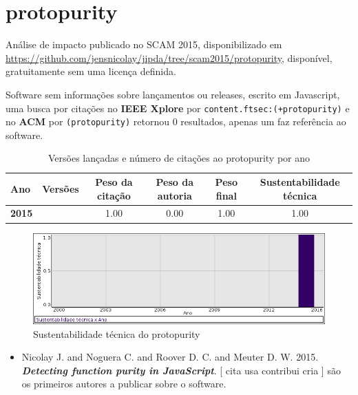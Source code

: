 \section{protopurity}

Análise de impacto
publicado no SCAM 2015,
disponibilizado em \url{https://github.com/jensnicolay/jipda/tree/scam2015/protopurity},
disponível,
gratuitamente
sem uma licença definida.

Software sem informações sobre lançamentos ou releases,
escrito em Javascript,
uma busca por citações no {\bf IEEE Xplore} por
\texttt{content.ftsec:(+protopurity)}
e no {\bf ACM} por
\texttt{(protopurity)}
retornou
0 resultados,
apenas um faz referência ao software.


\begin{table}[H]
\caption{Versões lançadas e número de citações ao protopurity por ano}
\centering
\begin{tabular}{| l | c | c | c | c | c |}
  \hline
  Ano & Versões & Peso da citação & Peso da autoria & Peso final & Sustentabilidade técnica \\
  \hline
            {\bf 2015}
          &
          
          &
          1.00
          &
          0.00
          &
          1.00
          &
            {\color{blue} 1.00}
          \\
\hline
\end{tabular}
\end{table}

\begin{figure}[h]
  \center
  \includegraphics[scale=0.50]{imagens/softwares-charts/protopurity.png}
  \caption{Sustentabilidade técnica do protopurity}
\end{figure}


\begin{itemize}
\item Nicolay J. and Noguera C. and Roover D. C. and Meuter D. W.
      2015.
        \textbf{\textit{ Detecting function purity in JavaScript}}.
      [
          cita
          usa
          contribui
          cria
      ]
são os primeiros autores a publicar sobre o software.
\end{itemize}
